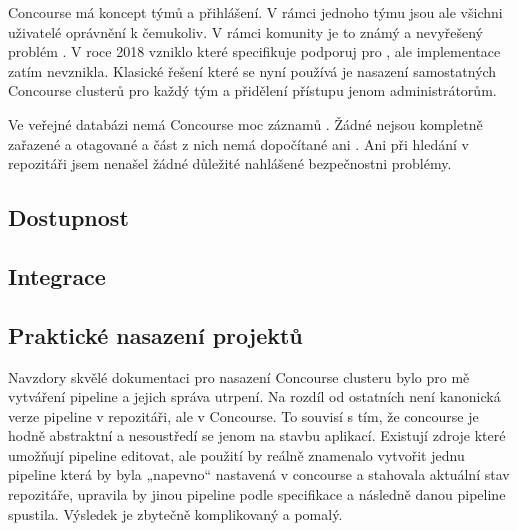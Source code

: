        Concourse má koncept týmů a přihlášení. V rámci jednoho týmu jsou ale všichni uživatelé oprávnění k čemukoliv. V rámci komunity je to známý a nevyřešený problém \cite{concourse-issue-1317}. V roce 2018 vzniklo  které specifikuje podporuj pro , ale implementace zatím nevznikla. Klasické řešení které se nyní používá je nasazení samostatných Concourse clusterů pro každý tým a přidělení přístupu jenom administrátorům.

        Ve veřejné databázi  nemá Concourse moc záznamů \cite{cve-concourse}. Žádné nejsou kompletně zařazené a otagované a část z nich nemá dopočítané ani . Ani při hledání v repozitáři jsem nenašel žádné důležité nahlášené bezpečnostni problémy.

    \subsection{Dostupnost}
        \blind[3]

    \subsection{Integrace}
        \blind[1]
        \blind[1]
        \blind[1]

    \subsection{Praktické nasazení projektů}
        Navzdory skvělé dokumentaci pro nasazení Concourse clusteru bylo pro mě vytváření pipeline a jejich správa utrpení. Na rozdíl od ostatních \CI není kanonická verze pipeline v repozitáři, ale v Concourse. To souvisí s tím, že concourse je hodně abstraktní a nesoustředí se jenom na stavbu aplikací. Existují zdroje \cite{concourse-pipeline-res} které umožňují pipeline editovat, ale použití by reálně znamenalo vytvořit jednu pipeline která by byla „napevno“ nastavená v concourse a stahovala aktuální stav repozitáře, upravila by jinou pipeline podle specifikace a následně danou pipeline spustila. Výsledek je zbytečně komplikovaný a pomalý.

